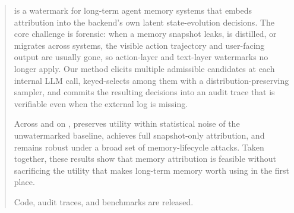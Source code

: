 
\begin{abstract}
\memmark{} is a watermark for long-term agent memory systems that
embeds attribution into the backend's own latent state-evolution
decisions. The core challenge is forensic: when a memory snapshot leaks,
is distilled, or migrates across systems, the visible action trajectory
and user-facing output are usually gone, so action-layer and text-layer
watermarks no longer apply. Our method elicits multiple admissible
candidates at each internal LLM call, keyed-selects among them with a
distribution-preserving sampler, and commits the resulting decisions
into an audit trace that is verifiable even when the external log is
missing.

Across \amem{} and \graphiti{} on \locomo{}, \memmark{} preserves
utility within statistical noise of the unwatermarked baseline,
achieves full snapshot-only attribution,
and remains robust under a broad set of memory-lifecycle attacks.
Taken together, these results show that memory attribution is feasible
without sacrificing the utility that makes long-term memory worth
using in the first place.

Code, audit traces, and benchmarks are released.
\end{abstract}
